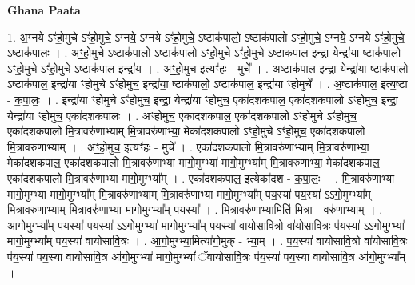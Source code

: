 \documentclass[17pt]{extarticle}
\begin{document}
\textbf{Ghana Paata } \newline

1. अ॒ग्नये ऽꣳ॑हो॒मुचे ऽꣳ॑हो॒मुचे॒ ऽग्नये॒ ऽग्नये ऽꣳ॑हो॒मुचे॒ ऽष्टाक॑पालो॒ ऽष्टाक॑पालो ऽꣳहो॒मुचे॒ ऽग्नये॒ ऽग्नये ऽꣳ॑हो॒मुचे॒ ऽष्टाक॑पालः । . अꣳ॒॒हो॒मुचे॒ ऽष्टाक॑पालो॒ ऽष्टाक॑पालो ऽꣳहो॒मुचे ऽꣳ॑हो॒मुचे॒ ऽष्टाक॑पाल॒ 
इन्द्रा॒ येन्द्रा॑या॒ ष्टाक॑पालो ऽꣳहो॒मुचे ऽꣳ॑हो॒मुचे॒ ऽष्टाक॑पाल॒ इन्द्रा॑य । . अꣳ॒॒हो॒मुच॒ इत्यꣳ॑हः - मुचे᳚ । . अ॒ष्टाक॑पाल॒ इन्द्रा॒ येन्द्रा॑या॒ ष्टाक॑पालो॒ ऽष्टाक॑पाल॒ इन्द्रा॑या ꣳहो॒मुचे ऽꣳ॑हो॒मुच॒ इन्द्रा॑या॒ ष्टाक॑पालो॒ ऽष्टाक॑पाल॒ इन्द्रा॑या ꣳहो॒मुचे᳚ । . अ॒ष्टाक॑पाल॒ इत्य॒ष्टा - क॒पा॒लः॒ । . इन्द्रा॑या ꣳहो॒मुचे ऽꣳ॑हो॒मुच॒ इन्द्रा॒ येन्द्रा॑या ꣳहो॒मुच॒ एका॑दशकपाल॒ एका॑दशकपालो ऽꣳहो॒मुच॒ इन्द्रा॒ येन्द्रा॑या ꣳहो॒मुच॒ एका॑दशकपालः । . अꣳ॒॒हो॒मुच॒ एका॑दशकपाल॒ एका॑दशकपालो ऽꣳहो॒मुचे ऽꣳ॑हो॒मुच॒ एका॑दशकपालो मि॒त्रावरु॑णाभ्याम् मि॒त्रावरु॑णाभ्या॒ मेका॑दशकपालो ऽꣳहो॒मुचे ऽꣳ॑हो॒मुच॒ एका॑दशकपालो मि॒त्रावरु॑णाभ्याम् । . अꣳ॒॒हो॒मुच॒ इत्यꣳ॑हः - मुचे᳚ । . एका॑दशकपालो मि॒त्रावरु॑णाभ्याम् मि॒त्रावरु॑णाभ्या॒ मेका॑दशकपाल॒ एका॑दशकपालो मि॒त्रावरु॑णाभ्या मागो॒मुग्भ्या॑ मागो॒मुग्भ्या᳚म् मि॒त्रावरु॑णाभ्या॒ मेका॑दशकपाल॒ एका॑दशकपालो मि॒त्रावरु॑णाभ्या मागो॒मुग्भ्या᳚म् । . एका॑दशकपाल॒ इत्येका॑दश - क॒पा॒लः॒ । . मि॒त्रावरु॑णाभ्या मागो॒मुग्भ्या॑ मागो॒मुग्भ्या᳚म् मि॒त्रावरु॑णाभ्याम् मि॒त्रावरु॑णाभ्या मागो॒मुग्भ्या᳚म् पय॒स्या॑ पय॒स्या॑ ऽऽगो॒मुग्भ्या᳚म् मि॒त्रावरु॑णाभ्याम् मि॒त्रावरु॑णाभ्या मागो॒मुग्भ्या᳚म् पय॒स्या᳚ । . मि॒त्रावरु॑णाभ्या॒मिति॑ मि॒त्रा - वरु॑णाभ्याम् । . आ॒गो॒मुग्भ्या᳚म् पय॒स्या॑ पय॒स्या॑ ऽऽगो॒मुग्भ्या॑ मागो॒मुग्भ्या᳚म् पय॒स्या॑ वायोसावि॒त्रो वा॑योसावि॒त्रः प॑य॒स्या॑ ऽऽगो॒मुग्भ्या॑ मागो॒मुग्भ्या᳚म् पय॒स्या॑ वायोसावि॒त्रः । . आ॒गो॒मुग्भ्या॒मित्या॑गो॒मुक् - भ्या॒म् । . प॒य॒स्या॑ वायोसावि॒त्रो वा॑योसावि॒त्रः प॑य॒स्या॑ पय॒स्या॑ वायोसावि॒त्र आ॑गो॒मुग्भ्या॑ मागो॒मुग्भ्यां᳚ ॅवायोसावि॒त्रः प॑य॒स्या॑ पय॒स्या॑ वायोसावि॒त्र आ॑गो॒मुग्भ्या᳚म् । \newline
\end{document}
